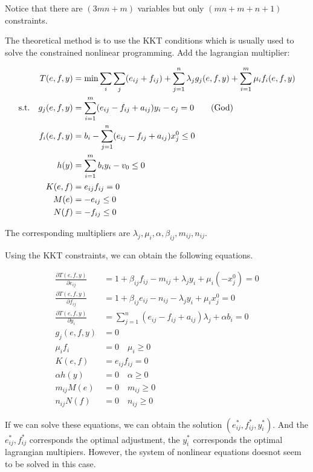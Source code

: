 \documentclass[UTF8]{article}
\numberwithin{equation}{section}
\begin{document}
Notice that there are $(3mn+m)$ variables but only $(mn+m+n+1)$ constraints.

The theoretical method is to use the KKT conditions which is usually used to solve the constrained nonlinear programming.
Add the lagrangian multiplier:

\begin{align}
  T(e,f,y) &= \min \sum_i\sum_j(e_{ij}+f_{ij}) + \sum_{j=1}^n \lambda_j
  g_j(e,f,y) + \sum_{i=1}^m \mu_i f_i(e,f,y)\nonumber\\
\mathrm{s.t.}  \quad   g_j(e,f,y) &= \sum_{i=1}^m (e_{ij}-f_{ij}+a_{ij})y_i-c_j = 0 \tag{\text{God}} \\
  f_i(e,f,y) &= b_i - \sum_{j=1}^n (e_{ij}-f_{ij}+a_{ij})x_j^0 \leq 0 \\
  h(y) &= \sum_{i=1}^m b_i y_i - v_0 \leq 0\\
  K(e,f) &= e_{ij}f_{ij}=0  \\
  M(e) &= -e_{ij} \leq 0 \label{M}  \\
  N(f) &= -f_{ij} \leq 0
\end{align}

The corresponding multipliers are $\lambda_j, \mu_i, \alpha, \beta_{ij}, m_{ij}, n_{ij}$.

Using the KKT constraints, we can obtain the following equations.

\begin{align*}
  \frac{\partial T(e,f,y)}{\partial e_{ij}} &= 1+ \beta_{ij} f_{ij} - m_{ij}+\lambda_j y_i + \mu_i(-x_j^0) = 0  \\
  \frac{\partial T(e,f,y)}{\partial f_{ij}} &= 1+ \beta_{ij} e_{ij} - n_{ij}-\lambda_j y_i + \mu_i x_j^0 = 0   \\
  \frac{\partial T(e,f,y)}{\partial y_{i}} &=\sum_{j=1}^n(e_{ij}-f_{ij}+a_{ij})\lambda_j + \alpha b_i = 0 \\
  g_j(e,f,y) &=0 \\
  \mu_i f_i &= 0 \quad \mu_i \geq 0 \\
  K(e,f) &= e_{ij}f_{ij} =0 \\
  \alpha h(y) &=0 \quad \alpha \geq 0\\
  m_{ij} M(e) &=0 \quad m_{ij} \geq 0 \\
  n_{ij} N(f) &=0 \quad n_{ij} \geq 0
\end{align*}

If we can solve these equations, we can obtain the solution $(e_{ij}^*, f_{ij}^*, y_i^*)$. And the $e_{ij}^*, f_{ij}^*$ corresponds the optimal adjustment, the $y_i^*$ corresponds the optimal lagrangian multipiers.
However, the system of nonlinear equations doesnot seem to be solved in this case.
\end{document}
